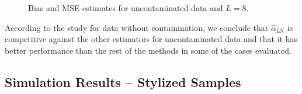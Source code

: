 \documentclass[twocolumn]{svjour3}
\begin{document}
	\begin{figure}[hbt]
		\centering
		\caption{Bias and MSE estimates for uncontaminated data and $L=8$.}\label{SesgoyECMSinContL=8} 
	\end{figure}
	
	According to the study for data without contamination, we conclude that $\widehat{\alpha}_{\text{{LN}}}$ is competitive against the other estimators for uncontaminated data and that it has better performance than the rest of the methods in some of the cases evaluated.
	
	\subsection{Simulation Results -- Stylized Samples}
	\label{StylizedSamples}
	
\end{document}
